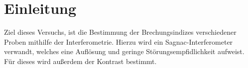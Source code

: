 \section{Einleitung}
Ziel dieses Versuchs, ist die Bestimmung der Brechungsindizes verschiedener Proben mithilfe der Interferometrie. Hierzu wird ein Sagnac-Interferometer verwandt, welches eine Auflösung und
geringe Störungsempfidlichkeit aufweist. Für dieses wird außerdem der Kontrast bestimmt. 
